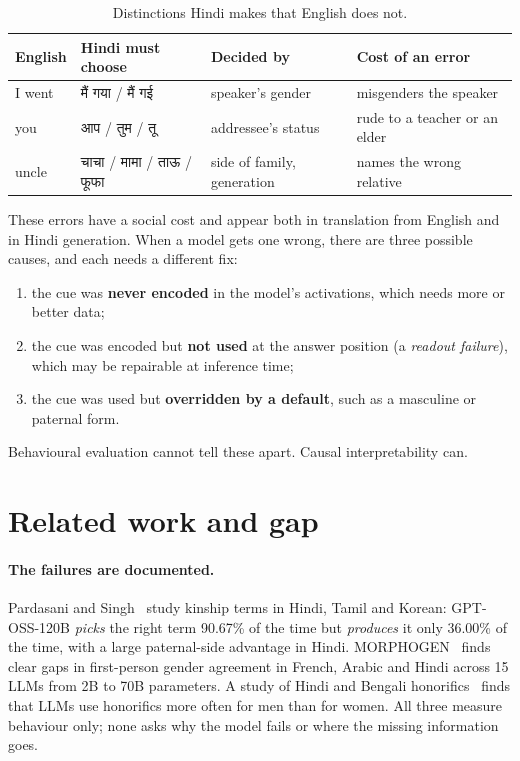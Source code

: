 \documentclass[11pt,a4paper]{article}
\newcommand{\hi}[1]{{\devfont #1}}
\begin{document}
\begin{table}[H]
\centering
\small
\begin{tabular}{@{}l l l l@{}}
\toprule
\textbf{English} & \textbf{Hindi must choose} & \textbf{Decided by} & \textbf{Cost of an error} \\
\midrule
I went & \hi{मैं गया} / \hi{मैं गई} & speaker's gender & misgenders the speaker \\
you & \hi{आप} / \hi{तुम} / \hi{तू} & addressee's status & rude to a teacher or an elder \\
uncle & \hi{चाचा} / \hi{मामा} / \hi{ताऊ} / \hi{फूफा} & side of family, generation & names the wrong relative \\
\bottomrule
\end{tabular}
\caption{Distinctions Hindi makes that English does not.}
\label{tab:english}
\end{table}

These errors have a social cost and appear both in translation from English and in Hindi generation. When a model gets one wrong, there are three possible causes, and each needs a different fix:
\begin{enumerate}[label=(\alph*)]
  \item the cue was \textbf{never encoded} in the model's activations, which needs more or better data;
  \item the cue was encoded but \textbf{not used} at the answer position (a \emph{readout failure}), which may be repairable at inference time;
  \item the cue was used but \textbf{overridden by a default}, such as a masculine or paternal form.
\end{enumerate}
Behavioural evaluation cannot tell these apart. Causal interpretability can.

\section{Related work and gap}

\paragraph{The failures are documented.}
Pardasani and Singh~\cite{pardasani2026} study kinship terms in Hindi, Tamil and Korean: GPT-OSS-120B \emph{picks} the right term 90.67\% of the time but \emph{produces} it only 36.00\% of the time, with a large paternal-side advantage in Hindi. MORPHOGEN~\cite{morphogen2026} finds clear gaps in first-person gender agreement in French, Arabic and Hindi across 15 LLMs from 2B to 70B parameters. A study of Hindi and Bengali honorifics~\cite{honorific2025} finds that LLMs use honorifics more often for men than for women. All three measure behaviour only; none asks why the model fails or where the missing information goes.
\end{document}
